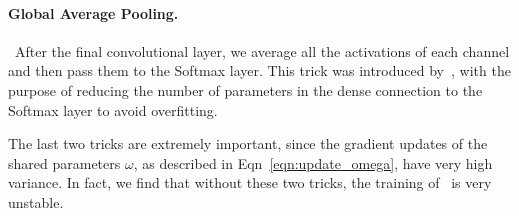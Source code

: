 \paragraph{Global Average Pooling.}~After the final convolutional layer, we average all the activations of each channel and then pass them to the Softmax layer. This trick was introduced by~\cite{network_in_network}, with the purpose of reducing the number of parameters in the dense connection to the Softmax layer to avoid overfitting.

The last two tricks are extremely important, since the gradient updates of the shared parameters $\omega$, as described in Eqn~\ref{eqn:update_omega}, have very high variance. In fact, we find that without these two tricks, the training of \enas~is very unstable.



